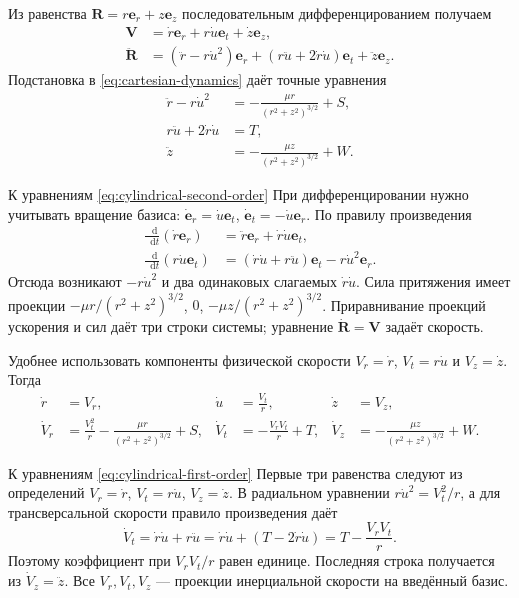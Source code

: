 \documentclass[a4paper,11pt]{article}
\newcommand{\dd}{\mathop{}\!\mathrm d}
\numberwithin{equation}{section}
\theoremstyle{remark}
\begin{document}
Из равенства $\boldsymbol R=r\boldsymbol e_r+z\boldsymbol e_z$
последовательным дифференцированием получаем
\begin {align*}
 \boldsymbol V&=\dot r\boldsymbol e_r+r\dot u\boldsymbol e_t
                 +\dot z\boldsymbol e_z,\\
 \ddot{\boldsymbol R}
 &=(\ddot r-r\dot u^2)\boldsymbol e_r
 +(r\ddot u+2\dot r\dot u)\boldsymbol e_t
 +\ddot z\boldsymbol e_z.
\end {align*}
Подстановка в \eqref{eq:cartesian-dynamics} даёт точные уравнения
\begin {equation}
 \begin {aligned}
  \ddot r-r\dot u^2&=-\frac{{\mu r}}{{(r^2+z^2)^{3/2}}}+S,\\
  r\ddot u+2\dot r\dot u&=T,\\
  \ddot z&=-\frac{{\mu z}}{{(r^2+z^2)^{3/2}}}+W.
 \end {aligned}
 \label {eq:cylindrical-second-order}
\end {equation}
\begin{explanation}{К уравнениям \eqref{eq:cylindrical-second-order}}
При дифференцировании нужно учитывать вращение базиса:
$\dot{\boldsymbol e}_r=\dot u\boldsymbol e_t$,
$\dot{\boldsymbol e}_t=-\dot u\boldsymbol e_r$.
По правилу произведения
\[
\begin{aligned}
\frac{\dd}{\dd t}(\dot r\boldsymbol e_r)
 &=\ddot r\boldsymbol e_r+\dot r\dot u\boldsymbol e_t,\\
\frac{\dd}{\dd t}(r\dot u\boldsymbol e_t)
 &=(\dot r\dot u+r\ddot u)\boldsymbol e_t-r\dot u^2\boldsymbol e_r.
\end{aligned}
\]
Отсюда возникают $-r\dot u^2$ и два одинаковых слагаемых
$\dot r\dot u$. Сила притяжения имеет проекции
$-\mu r/(r^2+z^2)^{3/2}$, $0$, $-\mu z/(r^2+z^2)^{3/2}$.
Приравнивание проекций ускорения и сил даёт три строки системы;
уравнение $\dot{\boldsymbol R}=\boldsymbol V$ задаёт скорость.
\end{explanation}

Удобнее использовать компоненты физической скорости
$V_r=\dot r$, $V_t=r\dot u$ и $V_z=\dot z$. Тогда
\begin {equation}
 \begin {aligned}
  \dot r&=V_r,&
  \dot u&=\frac{{V_t}}{{r}},&
  \dot z&=V_z,\\
  \dot V_r&=\frac{{V_t^2}}{{r}}
       -\frac{{\mu r}}{{(r^2+z^2)^{3/2}}}+S,&
  \dot V_t&=-\frac{{V_rV_t}}{{r}}+T,&
  \dot V_z&=-\frac{{\mu z}}{{(r^2+z^2)^{3/2}}}+W.
 \end {aligned}
 \label {eq:cylindrical-first-order}
\end {equation}
\begin{explanation}{К уравнениям \eqref{eq:cylindrical-first-order}}
Первые три равенства следуют из определений
$V_r=\dot r$, $V_t=r\dot u$, $V_z=\dot z$.
В радиальном уравнении $r\dot u^2=V_t^2/r$, а для трансверсальной
скорости правило произведения даёт
\[
\dot V_t=\dot r\dot u+r\ddot u
=\dot r\dot u+(T-2\dot r\dot u)
=T-\frac{V_rV_t}{r}.
\]
Поэтому коэффициент при $V_rV_t/r$ равен единице.
Последняя строка получается из $\dot V_z=\ddot z$.
Все $V_r,V_t,V_z$ --- проекции инерциальной скорости на введённый базис.
\end{explanation}
\end{document}
